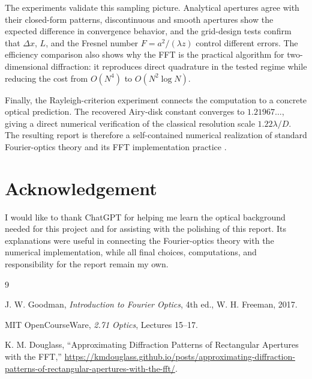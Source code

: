 \documentclass[12pt]{article}
\begin{document}
The experiments validate this sampling picture. Analytical apertures agree with their closed-form
patterns, discontinuous and smooth apertures show the expected difference in convergence behavior, and the
grid-design tests confirm that \(\Delta x\), \(L\), and the Fresnel number \(F=a^2/(\lambda z)\) control
different errors. The efficiency comparison also shows why the FFT is the practical algorithm for
two-dimensional diffraction: it reproduces direct quadrature in the tested regime while reducing the cost
from \(O(N^4)\) to \(O(N^2\log N)\).

Finally, the Rayleigh-criterion experiment connects the computation to a concrete optical prediction. The
recovered Airy-disk constant converges to \(1.21967\ldots\), giving a direct numerical verification of the
classical resolution scale \(1.22\lambda/D\). The resulting report is therefore a self-contained numerical
realization of standard Fourier-optics theory \cite{goodman2017,mit271} and its FFT implementation practice
\cite{douglass}.

\section*{Acknowledgement}

I would like to thank ChatGPT for helping me learn the optical background needed for this project and for
assisting with the polishing of this report. Its explanations were useful in connecting the Fourier-optics
theory with the numerical implementation, while all final choices, computations, and responsibility for the
report remain my own.

{}
\begin{thebibliography}{9}

J. W. Goodman, \textit{Introduction to Fourier Optics}, 4th ed., W. H. Freeman, 2017.

MIT OpenCourseWare, \textit{2.71 Optics}, Lectures 15--17.

K. M. Douglass, ``Approximating Diffraction Patterns of Rectangular Apertures with the FFT,''
\url{https://kmdouglass.github.io/posts/approximating-diffraction-patterns-of-rectangular-apertures-with-the-fft/}.

\end{thebibliography}
\end{document}

